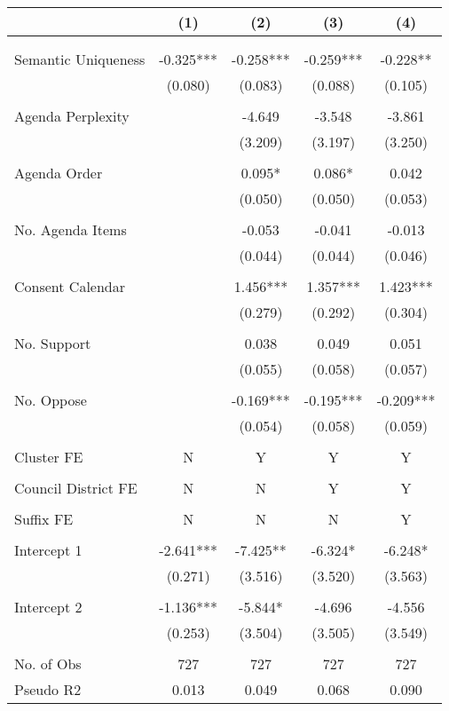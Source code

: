 \begin{tabular}{lcccc}
\toprule
 & (1) & (2) & (3) & (4) \\
\midrule
 &  &  &  &  \\
 &  &  &  &  \\
Semantic Uniqueness & -0.325*** & -0.258*** & -0.259*** & -0.228** \\
 & (0.080) & (0.083) & (0.088) & (0.105) \\
 &  &  &  &  \\
Agenda Perplexity &  & -4.649 & -3.548 & -3.861 \\
 &  & (3.209) & (3.197) & (3.250) \\
 &  &  &  &  \\
Agenda Order &  & 0.095* & 0.086* & 0.042 \\
 &  & (0.050) & (0.050) & (0.053) \\
 &  &  &  &  \\
No. Agenda Items &  & -0.053 & -0.041 & -0.013 \\
 &  & (0.044) & (0.044) & (0.046) \\
 &  &  &  &  \\
Consent Calendar &  & 1.456*** & 1.357*** & 1.423*** \\
 &  & (0.279) & (0.292) & (0.304) \\
 &  &  &  &  \\
No. Support &  & 0.038 & 0.049 & 0.051 \\
 &  & (0.055) & (0.058) & (0.057) \\
 &  &  &  &  \\
No. Oppose &  & -0.169*** & -0.195*** & -0.209*** \\
 &  & (0.054) & (0.058) & (0.059) \\
 &  &  &  &  \\
Cluster FE & N & Y & Y & Y \\
 &  &  &  &  \\
Council District FE & N & N & Y & Y \\
 &  &  &  &  \\
Suffix FE & N & N & N & Y \\
 &  &  &  &  \\
Intercept 1 & -2.641*** & -7.425** & -6.324* & -6.248* \\
 & (0.271) & (3.516) & (3.520) & (3.563) \\
 &  &  &  &  \\
Intercept 2 & -1.136*** & -5.844* & -4.696 & -4.556 \\
 & (0.253) & (3.504) & (3.505) & (3.549) \\
 &  &  &  &  \\
No. of Obs & 727 & 727 & 727 & 727 \\
Pseudo R2 & 0.013 & 0.049 & 0.068 & 0.090 \\
\bottomrule
\end{tabular}
